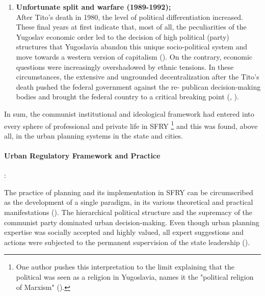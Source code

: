 \documentclass[11pt]{report}
\begin{document}
{{{{\begin{enumerate}
\item \textbf{Unfortunate split and warfare (1989-1992);}
\\
After Tito’s death in 1980, the level of political differentiation increased. These final years at first indicate that, most of all, the peculiarities of the Yugoslav economic order led to the decision of high political (party) structures that Yugoslavia abandon this unique socio-political system and move towards a western version of capitalism (\href{Estrin}{\citealt{estrin_yugoslavia:_1991}}).
On the contrary, economic questions were increasingly overshadowed by ethnic tensions. In these circumstances, the extensive and ungrounded decentralization after the Tito’s death pushed the federal government against the re- publican decision-making bodies and brought the federal country to a critical breaking point (\href{Estrin}{\citealt{estrin_yugoslavia:_1991}}, \href{Vujosevic}{\citealt{vujosevic_post-socialist_2012}}).
\end{enumerate}

In sum, the communist institutional and ideological framework had entered into every sphere of professional and private life in SFRY
\footnote{One author pushes this interpretation to the limit explaining that the political was seen as a religion in Yugoslavia, names it the "political religion of Marxism" (\href{Doytchinov}{\citealt{doytchinov_belgrade_2015}}).}
and this was found, above all, in the urban planning systems in the state and cities.

\paragraph{Urban Regulatory Framework and Practice}:

The  practice  of  planning  and  its  implementation  in  SFRY  can  be  circumscribed  as the  development  of  a single  paradigm,  in  its  various  theoretical  and  practical  manifestations  (\href{Vukmirovic}{\citealt{vukmirovic_city_2013}}).
The hierarchical political structure and the supremacy of the communist party dominated urban decision-making.
Even though urban planning expertise was socially accepted and highly valued, all expert suggestions and actions were subjected to the permanent supervision of the state leadership (\href{Piha}{\citealt{piha_osnove_1986}}).
\\

}}}}
\end{document}
